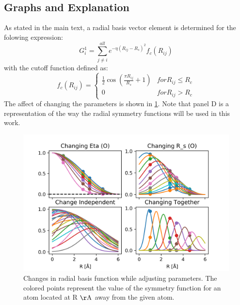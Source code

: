 \documentclass{article}
\begin{document}
\subsection{ Graphs and Explanation}
As stated in the main text, a radial basis vector element is determined for the folowing expression:
\begin{equation}\label{eq:aprad}
	G^{1}_{i} = \sum_{j \neq i}^{all} e^{-\eta ( R_{ij} - R_{s})^2} f_{c}(R_{ij})
\end{equation}
with the cutoff function defined as:
\begin{equation}
 	f_c(R_{ij}) = 
	\begin{cases}
		\frac{1}{2}\cos{(\frac{\pi R_{ij}} {R_s} + 1 )} & for R_{ij} \leq R_{c} \\
		0 & for R_{ij} > R_c

	\end{cases}
\end{equation}
The affect of changing the parameters is shown in  \ref{fig:rad_funcs}. Note that panel D is a representation of the way the radial symmetry functions will be used in this work.
\begin{figure}
	\includegraphics[width=\linewidth]{./img/rad_graphs.png}	\caption{Changes in radial basis function while adjusting parameters. The colored points represent the value of the symmetry function for an atom located at R $\mathrm{\AA}$ away from the given atom.}
	\label{fig:rad_funcs}
\end{figure}
\end{document}
